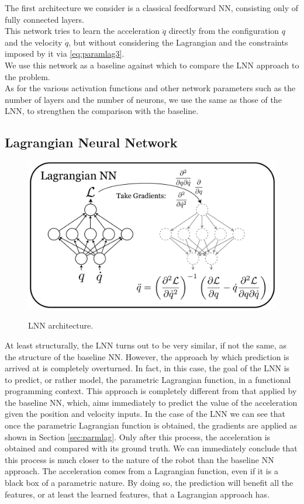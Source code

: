 \documentclass[a4paper]{article}
\begin{document}
The first architecture we consider is a classical feedforward NN, consisting only of fully connected layers.\\ This network tries to learn the acceleration $\ddot{q}$ directly from the configuration $q$ and the velocity $\dot{q}$, but without considering the Lagrangian and the constraints imposed by it via \eqref{eq:paramlag3}.\\ We use this network as a baseline against which to compare the LNN approach to the problem.\\ As for the various activation functions and other network parameters such as the number of layers and the number of neurons, we use the same as those of the LNN, to strengthen the comparison with the baseline.

\subsection{Lagrangian Neural Network}
\begin{figure}
\begin{center}
    \label{img:lnn_arch}
    \includegraphics[scale=0.1]{./img/lnn.png}  
    \caption{LNN architecture.}
\end{center}
\end{figure}
At least structurally, the LNN turns out to be very similar, if not the same, as the structure of the baseline NN. However, the approach by which prediction is arrived at is completely overturned. In fact, in this case, the goal of the LNN is to predict, or rather model, the parametric Lagrangian function, in a functional programming context. This approach is completely different from that applied by the baseline NN, which, aims immediately to predict the value of the acceleration given the position and velocity inputs. In the case of the LNN we can see that once the parametric Lagrangian function is obtained, the gradients are applied as shown in Section \ref{sec:parmlag}. Only after this process, the acceleration is obtained and compared with its ground truth. We can immediately conclude that this process is much closer to the nature of the robot than the baseline NN approach. The acceleration comes from a Lagrangian function, even if it is a black box of a parametric nature. By doing so, the prediction will benefit all the features, or at least the learned features, that a Lagrangian approach has.
\end{document}
